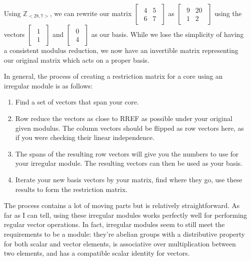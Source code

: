 \documentclass[a4paper, 12pt, reqno]{amsart}
\begin{document}
		Using $\mathds{Z}_{<28, 7>}$, we can rewrite our matrix
		$
			\begin{bmatrix}
				\begin{smallmatrix}
					4 & 5 \\
					6 & 7
				\end{smallmatrix}
			\end{bmatrix}
		$
		as
		$
			\begin{bmatrix}
				\begin{smallmatrix}
					9 & 20 \\
					1 & 2
				\end{smallmatrix}
			\end{bmatrix}
		$
		using the vectors 
		$
			\begin{bmatrix}
				\begin{smallmatrix}
					1 \\
					1
				\end{smallmatrix}
			\end{bmatrix}
		$
		and
		$
			\begin{bmatrix}
				\begin{smallmatrix}
					0 \\
					4
				\end{smallmatrix}
			\end{bmatrix}
		$
		as our basis. While we lose the simplicity of having a consistent modulus reduction, we now have
		an invertible matrix representing our original matrix which acts on a proper basis.
		
		In general, the process of creating a restriction matrix for a core using an irregular module is 
		as follows:
		\begin{enumerate}
			\item Find a set of vectors that span your core.
			\item Row reduce the vectors as close to RREF as possible under your original given modulus. The
			column vectors should be flipped as row vectors here, as if you were checking their linear
			independence.
			\item The spans of the resulting row vectors will give you the numbers to use for your irregular
			module. The resulting vectors can then be used as your basis.
			\item Iterate your new basis vectors by your matrix, find where they go, use these results to
			form the restriction matrix.
		\end{enumerate}
		
		The process contains a lot of moving parts but is relatively straightforward. As far as I can tell,
		using these irregular modules works perfectly well for performing regular vector operations. In fact,
		irregular modules seem to still meet the requirements to be a module: they're abelian groups
		with a distributive property for both scalar and vector elements, is associative over multiplication
		between two elements, and has a compatible scalar identity for vectors.
		
\end{document}
